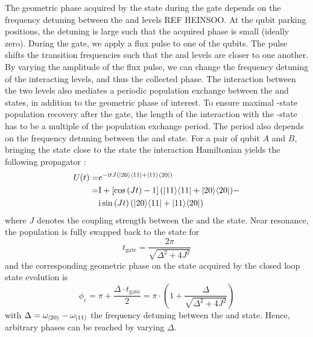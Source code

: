 The geometric phase acquired by the \oo state during the gate depends on the frequency detuning between the \oo and \tz levels REF HEINSOO. At the qubit parking positions, the detuning is large such that the acquired phase is small (ideally zero). During the gate, we apply a flux pulse to one of the qubits. The pulse shifts the transition frequencies such that the \oo and \tz levels are closer to one another. By varying the amplitude of the flux pulse, we can change the frequency detuning of the interacting levels, and thus the collected phase. The interaction between the two levels also mediates a periodic population exchange between the \oo and \tz states, in addition to the geometric phase of interest. To ensure maximal \oo-state population recovery after the gate, the length of the interaction with the \tz-state has to be a multiple of the population exchange period. The period also depends on the frequency detuning between the \oo and \tz state. 
For a pair of qubit $A$ and $B$, bringing the \oo state close to the \tz state the interaction Hamiltonian yields the following propagator \cite[p.~87]{Heinsoo2018}: 
\begin{equation}
    \begin{aligned}
U(t)=& e^{-\mathrm i t J(|20\rangle\langle 11 |+|  11 \rangle \langle 20|)} \\
=& \mathrm{I}+\left[\cos \left(J t\right)-1\right](|11\rangle\langle 11|+| 20\rangle\langle 20|)-\\
& \mathrm i \sin \left(J t\right)(|20\rangle\langle 11|+| 11\rangle\langle 20|)
\end{aligned}
\end{equation}
 where $J$ denotes the coupling strength between the \oo and the \tz state. Near resonance, the population is fully swapped back to the \oo state for
 \begin{equation}
     t_{\textrm{gate}} = \frac{2\pi} { \sqrt { \Delta ^ { 2 } + 4 J ^ { 2 } } }
 \end{equation} 
 and the corresponding geometric phase on the \oo state acquired by the closed loop state evolution is 
 \begin{equation} \label{eq:ch4_acquired_cond_phase}
     \phi_{ c } = \pi + \frac{\Delta \cdot t_{\textrm{gate}}}{2} = \pi \cdot \left( 1 + \frac { \Delta } { \sqrt { \Delta ^ { 2 } + 4 J ^ { 2 } } } \right)
 \end{equation}
 with $\Delta = \omega_{\ket{20}} - \omega_{\ket{11}}$ the frequency detuning between the \tz and \oo state. Hence, arbitrary phases can be reached by varying $\Delta$.
 
